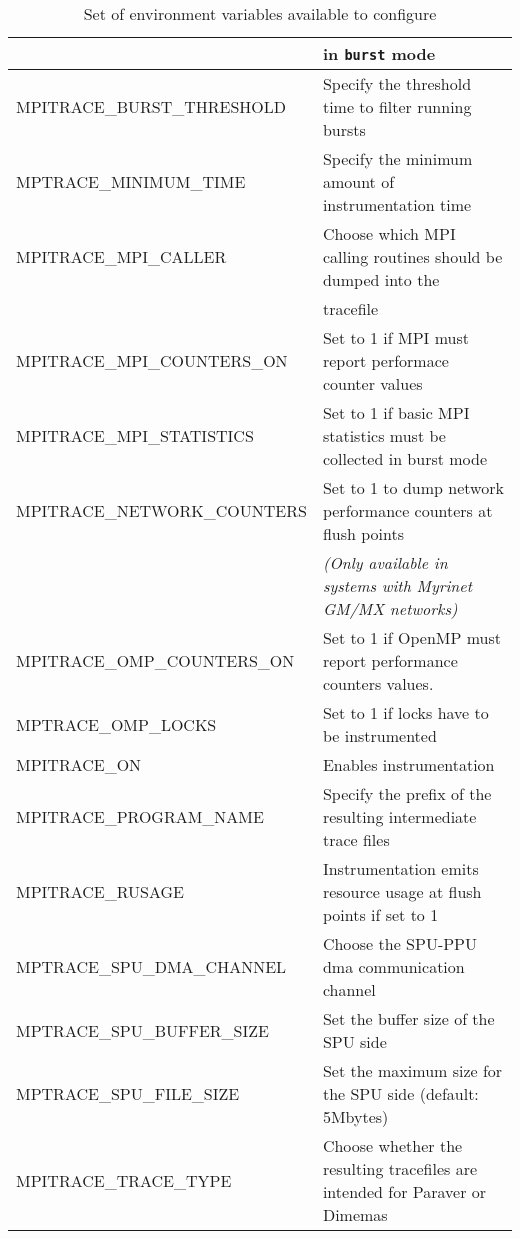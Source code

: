 \begin{table}[!ht]
{\begin{tabular}{| l | l |}
                          & in {\tt burst} mode\\
  \hline
  MPITRACE\_BURST\_THRESHOLD & Specify the threshold time to filter running bursts\\
  \hline
  MPTRACE\_MINIMUM\_TIME & Specify the minimum amount of instrumentation time\\
  \hline
  MPITRACE\_MPI\_CALLER & Choose which MPI calling routines should be dumped into the\\
                        & tracefile\\
  \hline
  MPITRACE\_MPI\_COUNTERS\_ON & Set to 1 if MPI must report performace counter values\\
  \hline 
  MPITRACE\_MPI\_STATISTICS & Set to 1 if basic MPI statistics must be collected in burst mode\\
  \hline
  MPITRACE\_NETWORK\_COUNTERS & Set to 1 to dump network performance counters at flush points\\
                              & {\em (Only available in systems with Myrinet GM/MX networks)}\\
  \hline
  MPITRACE\_OMP\_COUNTERS\_ON & Set to 1 if OpenMP must report performance counters values. \\
  \hline
  MPTRACE\_OMP\_LOCKS & Set to 1 if locks have to be instrumented\\
  \hline 
  MPITRACE\_ON & Enables instrumentation\\
  \hline
  MPITRACE\_PROGRAM\_NAME & Specify the prefix of the resulting intermediate trace files\\ 
  \hline
  MPITRACE\_RUSAGE & Instrumentation emits resource usage at flush points if set to 1\\
  \hline
  MPTRACE\_SPU\_DMA\_CHANNEL & Choose the SPU-PPU dma communication channel\\
  \hline
  MPTRACE\_SPU\_BUFFER\_SIZE & Set the buffer size of the SPU side\\
  \hline 
  MPTRACE\_SPU\_FILE\_SIZE & Set the maximum size for the SPU side (default: 5Mbytes)\\
  \hline
  MPITRACE\_TRACE\_TYPE & Choose whether the resulting tracefiles are intended for Paraver or Dimemas\\
  \hline
\end{tabular}
}
\caption{Set of environment variables available to configure \TRACE}
\label{tab:EnvironmentVariables}
\end{table}

